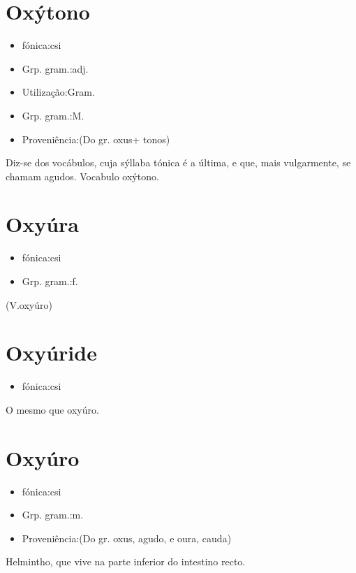 \section{Oxýtono}
\begin{itemize}
\item {fónica:csi}
\end{itemize}
\begin{itemize}
\item {Grp. gram.:adj.}
\end{itemize}
\begin{itemize}
\item {Utilização:Gram.}
\end{itemize}
\begin{itemize}
\item {Grp. gram.:M.}
\end{itemize}
\begin{itemize}
\item {Proveniência:(Do gr. \textunderscore oxus\textunderscore  + \textunderscore tonos\textunderscore )}
\end{itemize}
Diz-se dos vocábulos, cuja sýllaba tónica é a última, e que, mais vulgarmente, se chamam agudos.
Vocabulo oxýtono.
\section{Oxyúra}
\begin{itemize}
\item {fónica:csi}
\end{itemize}
\begin{itemize}
\item {Grp. gram.:f.}
\end{itemize}
(V.oxyúro)
\section{Oxyúride}
\begin{itemize}
\item {fónica:csi}
\end{itemize}
O mesmo que \textunderscore oxyúro\textunderscore .
\section{Oxyúro}
\begin{itemize}
\item {fónica:csi}
\end{itemize}
\begin{itemize}
\item {Grp. gram.:m.}
\end{itemize}
\begin{itemize}
\item {Proveniência:(Do gr. \textunderscore oxus\textunderscore , agudo, e \textunderscore oura\textunderscore , cauda)}
\end{itemize}
Helmintho, que vive na parte inferior do intestino recto.
